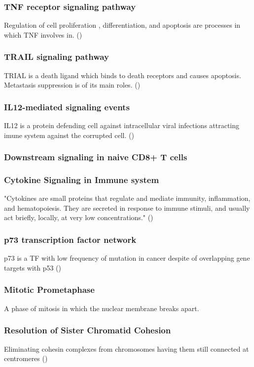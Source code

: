 \documentclass[3p,authoryear,preprint,12pt]{elsarticle}
\begin{document}
\subsubsection{TNF receptor signaling pathway}
Regulation of cell proliferation , differentiation, and apoptosis are processes in which TNF involves in. (\cite{TNFR P sig})

\subsubsection{TRAIL signaling pathway}
TRIAL is a death ligand which binds to death receptors and causes apoptosis. Metastasis suppression is of its main roles. (\cite{Thorburn2007})

\subsubsection{IL12-mediated signaling events}
IL12 is a protein defending cell against intracellular viral infections attracting imune system against the corrupted cell. (\cite{Liu2005})

\subsubsection{Downstream signaling in naive CD8+ T cells}

\subsubsection{Cytokine Signaling in Immune system}
"Cytokines are small proteins that regulate and mediate immunity, inflammation, and hematopoiesis. They are secreted in response to immune stimuli, and usually act briefly, locally, at very low concentrations." (\cite{Reactome C sig in IS})

\subsubsection{p73 transcription factor network}
p73 is a TF with low frequency of mutation in cancer despite of overlapping gene targets with p53 (\cite{Yu2006})

\subsubsection{Mitotic Prometaphase}
A phase of mitosis in which the nuclear membrane breaks apart.

\subsubsection{Resolution of Sister Chromatid Cohesion}
Eliminating cohesin complexes from chromosomes having them still connected at centromeres (\cite{Reactome RSCC})
\end{document}
